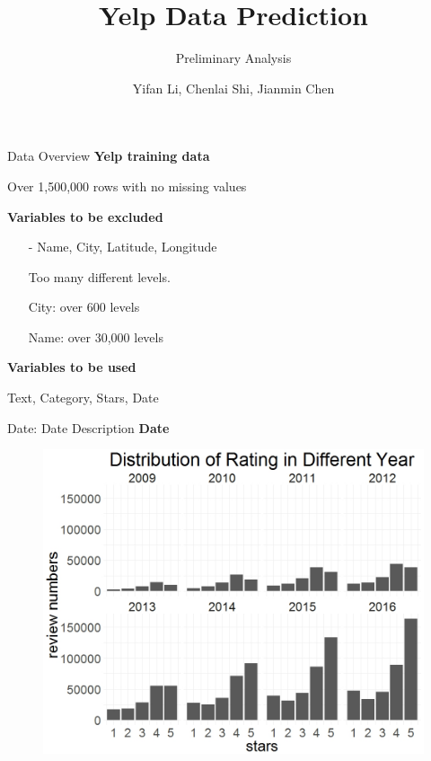 \documentclass[10pt]{beamer}
\title{Yelp Data Prediction}
\subtitle{Preliminary Analysis}
\date{}
\author{Yifan Li, Chenlai Shi, Jianmin Chen}
\institute{Monday Group 1}
\begin{document}
\maketitle

\begin{frame}{Data Overview}
\textbf{Yelp training data} 

Over 1,500,000 rows with no missing values

\textbf{Variables to be excluded}
\begin{itemize}
    \item[-] Name, City, Latitude, Longitude
    
    Too many different levels.
    
    City: over 600 levels
    
    Name: over 30,000 levels
\end{itemize}

\textbf{Variables to be used}

Text, Category, Stars, Date
\end{frame}

\begin{frame}{Date: Date Description}
\textbf{Date}
\begin{figure}
    \centering
    \includegraphics[scale=0.3]{date.jpeg}
\end{figure}    
    
\end{frame}

\end{document}
